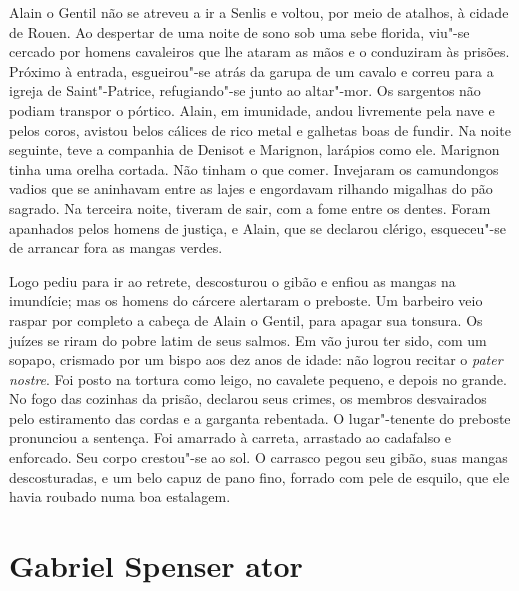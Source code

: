 Alain o Gentil não se atreveu a ir a Senlis e voltou, por meio de atalhos,
à cidade de Rouen. Ao despertar de uma noite de sono sob uma sebe florida,
viu"-se cercado por homens cavaleiros que lhe ataram as mãos e o conduziram
às prisões. Próximo à entrada, esgueirou"-se atrás da garupa de um cavalo e
correu para a igreja de Saint"-Patrice, refugiando"-se junto ao altar"-mor.
Os sargentos não podiam transpor o pórtico. Alain, em imunidade, andou
livremente pela nave e pelos coros, avistou belos cálices de rico metal e
galhetas boas de fundir. Na noite seguinte, teve a companhia de Denisot e
Marignon, larápios como ele. Marignon tinha uma orelha cortada. Não tinham
o que comer. Invejaram os camundongos vadios que se aninhavam entre as
lajes e engordavam rilhando migalhas do pão sagrado. Na terceira noite,
tiveram de sair, com a fome entre os dentes. Foram apanhados pelos homens
de justiça, e Alain, que se declarou clérigo, esqueceu"-se de arrancar fora
as mangas verdes.

Logo pediu para ir ao retrete, descosturou o gibão e enfiou as mangas na
imundície; mas os homens do cárcere alertaram o preboste. Um barbeiro veio
raspar por completo a cabeça de Alain o Gentil, para apagar sua tonsura.
Os juízes se riram do pobre latim de seus salmos. Em vão jurou ter sido,
com um sopapo, crismado por um bispo aos dez anos de idade: não logrou
recitar o \textit{pater nostre}. Foi posto na tortura como leigo, no
cavalete pequeno, e depois no grande. No fogo das cozinhas da prisão,
declarou seus crimes, os membros desvairados pelo estiramento das cordas e
a garganta rebentada. O lugar"-tenente do preboste pronunciou a sentença.
Foi amarrado à carreta, arrastado ao cadafalso e enforcado. Seu corpo
crestou"-se ao sol. O carrasco pegou seu gibão, suas mangas descosturadas,
e um belo capuz de pano fino, forrado com pele de esquilo, que ele havia
roubado numa boa estalagem.

\chapter{Gabriel Spenser ator}


